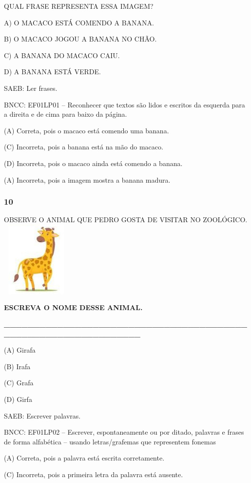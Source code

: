 QUAL FRASE REPRESENTA ESSA IMAGEM?

A) O MACACO ESTÁ COMENDO A BANANA.

B) O MACACO JOGOU A BANANA NO CHÃO.

C) A BANANA DO MACACO CAIU.

D) A BANANA ESTÁ VERDE.

SAEB: Ler frases.

BNCC: EF01LP01 -- Reconhecer que textos são lidos e escritos da esquerda para a
direita e de cima para baixo da página.

(A) Correta, pois o macaco está comendo uma banana.

(C) Incorreta, pois a banana está na mão do macaco.

(D) Incorreta, pois o macaco ainda está comendo a banana.

(A) Incorreta, pois a imagem mostra a banana madura.

\subsubsection{10}\label{section-50}

OBSERVE O ANIMAL QUE PEDRO GOSTA DE VISITAR NO
ZOOLÓGICO.\includegraphics[width=1.36806in,height=1.47778in]{media/image219.jpg}

\textbf{ESCREVA O NOME DESSE ANIMAL.}

\textbf{\_\_\_\_\_\_\_\_\_\_\_\_\_\_\_\_\_\_\_\_\_\_\_\_\_\_\_\_\_\_\_\_\_\_\_\_\_\_\_\_\_\_\_\_\_\_\_\_\_\_\_\_\_\_\_\_\_\_\_\_\_\_\_\_}

(A) Girafa

(B) Irafa

(C) Grafa

(D) Girfa

SAEB: Escrever palavras.

BNCC: EF01LP02 -- Escrever, espontaneamente ou por ditado,
palavras e frases de forma alfabética -- usando letras/grafemas que
representem fonemas

(A) Correta, pois a palavra está escrita corretamente.

(C) Incorreta, pois a primeira letra da palavra está ausente.

